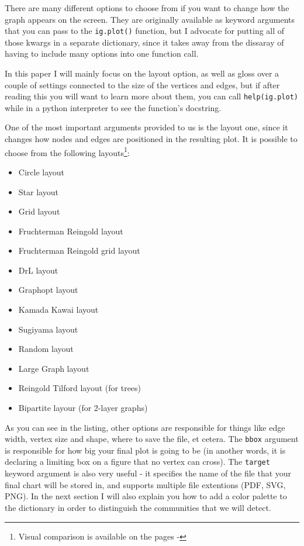 \documentclass[12pt, a4paper]{article}
\begin{document}


There are many different options to choose from if you want to change how the graph appears on the screen. They are originally available as keyword arguments that you can pass to the \texttt{ig.plot()} function, but I advocate for putting all of those kwargs in a separate dictionary,  since it takes away from the dissaray of having to include many options into one function call.

In this paper I will mainly focus on the layout option, as well as gloss over a couple of settings connected to the size of the vertices and edges, but if after reading this you will want to learn more about them, you can call \texttt{help(ig.plot)} while in a python interpreter to see the function's docstring.

One of the most important arguments provided to us is the layout one, since it changes how nodes and edges are positioned in the resulting plot. It is possible to choose from the following layouts\footnote{Visual comparison is available on the pages \pageref{fig:hdg_c1}-\pageref{fig:hdg_c9}}:

\begin{multicols}{2}
  \begin{itemize}
  \item Circle layout
  \item Star layout
  \item Grid layout
  \item Fruchterman Reingold layout
  \item Fruchterman Reingold grid layout
  \item DrL layout
  \item Graphopt layout
  \item Kamada Kawai layout
  \item Sugiyama layout
  \item Random layout
  \item Large Graph layout
  \item Reingold Tilford layout (for trees)
  \item Bipartite layour (for 2-layer graphs)
  \end{itemize}
\end{multicols}

As you can see in the listing, other options are responsible for things like edge width, vertex size and shape, where to save the file, et cetera. The \texttt{bbox} argument is responsible for how big your final plot is going to be (in another words, it is declaring a limiting box on a figure that no vertex can cross). The \texttt{target} keyword argument is also very useful - it specifies the name of the file that your final chart will be stored in, and supports multiple file extentions (PDF, SVG, PNG).  In the next section I will also explain you how to add a color palette to the dictionary in order to distinguish the communities that we will detect.
\end{document}
